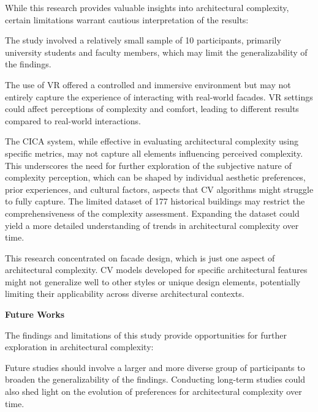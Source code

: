 While this research provides valuable insights into architectural complexity, certain limitations warrant cautious interpretation of the results:

The study involved a relatively small sample of 10 participants, primarily university students and faculty members, which may limit the generalizability of the findings.

The use of VR offered a controlled and immersive environment but may not entirely capture the experience of interacting with real-world facades.
VR settings could affect perceptions of complexity and comfort, leading to different results compared to real-world interactions.

The CICA system, while effective in evaluating architectural complexity using specific metrics, may not capture all elements influencing perceived complexity.
This underscores the need for further exploration of the subjective nature of complexity perception, which can be shaped by individual aesthetic preferences, prior experiences, and cultural factors, aspects that CV algorithms might struggle to fully capture.
The limited dataset of 177 historical buildings may restrict the comprehensiveness of the complexity assessment.
Expanding the dataset could yield a more detailed understanding of trends in architectural complexity over time.

This research concentrated on facade design, which is just one aspect of architectural complexity.
CV models developed for specific architectural features might not generalize well to other styles or unique design elements, potentially limiting their applicability across diverse architectural contexts.


\textbf{Future Works}

The findings and limitations of this study provide opportunities for further exploration in architectural complexity:


Future studies should involve a larger and more diverse group of participants to broaden the generalizability of the findings.
Conducting long-term studies could also shed light on the evolution of preferences for architectural complexity over time.

